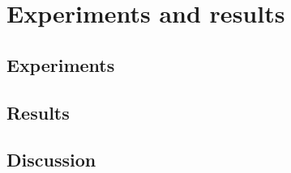 \chapter{Experiments and results}

\section{Experiments}

\section{Results}

\section{Discussion}



	
	
